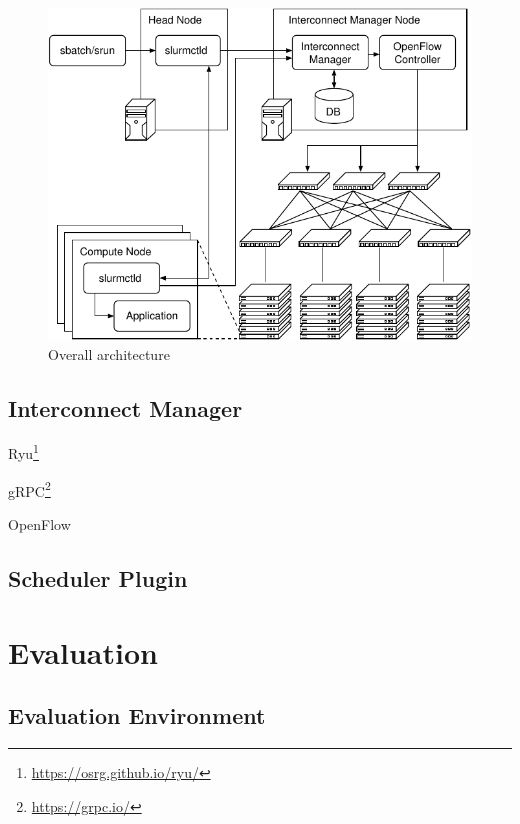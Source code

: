\documentclass[graybox]{svmult}
\begin{document}
\begin{figure}
    \centering
    \includegraphics{architecture}
    \caption{Overall architecture}%
    \label{kt:fig:architecture}
\end{figure}

\subsection{Interconnect Manager}

Ryu\footnote{\url{https://osrg.github.io/ryu/}}

gRPC\footnote{\url{https://grpc.io/}}

OpenFlow~\cite{McKeown2008}

\subsection{Scheduler Plugin}

\section{Evaluation}

\subsection{Evaluation Environment}
\end{document}
